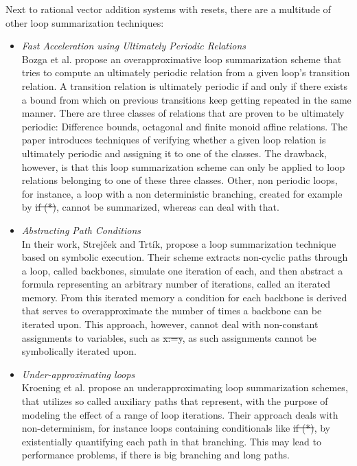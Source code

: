 
Next to rational vector addition systems with resets, there are a multitude of other loop summarization techniques:

\begin{itemize}
	\item \textsl{Fast Acceleration using Ultimately Periodic Relations}\cite{10.1007/978-3-642-14295-6_23}\\ Bozga et al. propose an overapproximative loop summarization scheme that tries to compute an ultimately periodic relation from a given loop's transition relation. A transition relation is ultimately periodic if and only if there exists a bound from which on previous transitions keep getting repeated in the same manner. There are three classes of relations that are proven to be ultimately periodic: Difference bounds, octagonal and finite monoid affine relations. The paper introduces techniques of verifying whether a given loop relation is ultimately periodic and assigning it to one of the classes. The drawback, however, is that this loop summarization scheme can only be applied to loop relations belonging to one of these three classes. Other, non periodic loops, for instance, a loop with a non deterministic branching, created for example by \st{if (*)}, cannot be summarized, whereas \qvasr can deal with that.
	
	\item \textsl{Abstracting Path Conditions}\cite{DBLP:conf/issta/StrejcekT12} \\
	In their work, Strejček and Trtík, propose a loop summarization technique based on symbolic execution. Their scheme extracts non-cyclic paths through a loop, called backbones, simulate one iteration of each, and then abstract a formula representing an arbitrary number of iterations, called an iterated memory. From this iterated memory a condition for each backbone is derived that serves to overapproximate the number of times a backbone can be iterated upon. This approach, however, cannot deal with non-constant assignments to variables, such as \st{x:=y}, as such assignments cannot be symbolically iterated upon.
	
	\item \textsl{Under-approximating loops}\cite{DBLP:conf/cav/KroeningLW13} \\
	Kroening et al. propose an underapproximating loop summarization schemes, that utilizes so called auxiliary paths that represent, with the purpose of modeling the effect of a range of loop iterations. Their approach deals with non-determinism, for instance loops containing conditionals like \st{if (*)}, by existentially quantifying each path in that branching. This may lead to performance problems, if there is big branching and long paths.
	
\end{itemize}